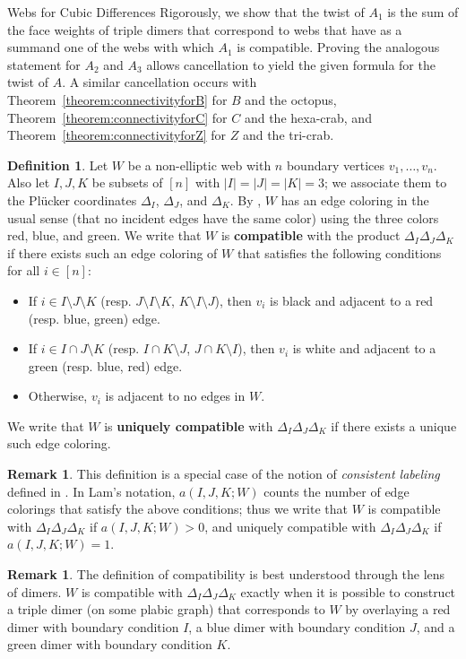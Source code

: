 \documentclass[11pt]{article}
\theoremstyle{definition}
\newtheorem{defi}[theo]{Definition}
\newtheorem{rema}[theo]{Remark}
\numberwithin{equation}{section}
\numberwithin{equation}{section}
\begin{document}
\begin{subsection}{Webs for Cubic Differences}
Rigorously, we show that the twist of $A_1$ is the sum of the face weights of triple dimers that correspond to webs that have as a summand one of the webs with which $A_1$ is compatible. Proving the analogous statement for $A_2$ and $A_3$ allows cancellation to yield the given formula for the twist of $A$. A similar cancellation occurs with Theorem~\ref{theorem:connectivityforB} for $B$ and the octopus, Theorem~\ref{theorem:connectivityforC} for $C$ and the hexa-crab, and Theorem~\ref{theorem:connectivityforZ} for $Z$ and the tri-crab.

\begin{defi}
Let $W$ be a non-elliptic web with $n$ boundary vertices $v_1,\dots, v_n$. Also let $I,J,K$ be subsets of $[n]$ with $|I|=|J|=|K|=3$; we associate them to the Pl{\"u}cker coordinates $\Delta_I$, $\Delta_J$, and $\Delta_K$. By \cite[Lemma~4.11]{lam2015}, $W$ has an edge coloring in the usual sense (that no incident edges have the same color) using the three colors red, blue, and green. We write that $W$ is \textbf{compatible} with the product $\Delta_I\Delta_J\Delta_K$ if there exists such an edge coloring of $W$ that satisfies the following conditions for all $i \in [n]$:
\begin{itemize}
    \item If $i \in I\setminus J \setminus K$ (resp. $J\setminus I \setminus K$, $K\setminus I \setminus J$), then $v_i$ is black and adjacent to a red (resp. blue, green) edge.
    \item If $i \in I\cap J \setminus K$ (resp. $I\cap K \setminus J$, $J\cap K \setminus I$), then $v_i$ is white and adjacent to a green (resp. blue, red) edge.
    \item Otherwise, $v_i$ is adjacent to no edges in $W$.
\end{itemize}
We write that $W$ is \textbf{uniquely compatible} with $\Delta_I\Delta_J\Delta_K$ if there exists a unique such edge coloring. 
\end{defi}
\begin{rema}\label{rmk:aIJK}
This definition is a special case of the notion of \textit{consistent labeling} defined in \cite[Section 4.5]{lam2015}. In Lam's notation, $a(I,J,K;W)$ counts the number of edge colorings that satisfy the above conditions; thus we write that $W$ is compatible with $\Delta_I\Delta_J\Delta_K$ if $a(I,J,K;W) >0$, and uniquely compatible with $\Delta_I\Delta_J\Delta_K$ if $a(I,J,K;W) =1$.
\end{rema}
\begin{rema}
The definition of compatibility is best understood through the lens of dimers. $W$ is compatible with $\Delta_I\Delta_J\Delta_K$ exactly when it is possible to construct a triple dimer (on some plabic graph) that corresponds to $W$ by overlaying a red dimer with boundary condition $I$, a blue dimer with boundary condition $J$, and a green dimer with boundary condition $K$.
\end{rema}


\end{subsection}
\end{document}
